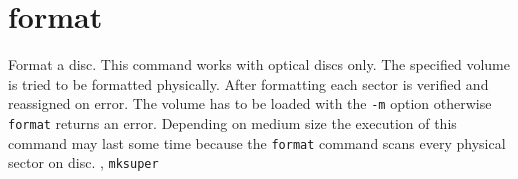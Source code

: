 \section{format}
\begin{man}
  \PP Format a disc.
  \DE This command works with optical discs only.
             The specified volume is tried to be formatted physically. After
             formatting each sector is verified and reassigned on error. The
             volume has to be loaded with the {\tt -m} option otherwise {\tt format}
             returns an error. Depending on medium size the execution of this
             command may last some time because the {\tt format} command scans every
             physical sector on disc.
  , {\tt mksuper}
\end{man}
